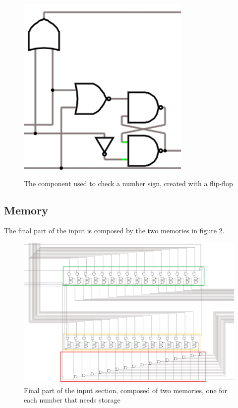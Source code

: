 \documentclass{article}
\begin{document}
\begin{figure}[h]
    \centering
    \includegraphics[scale=.5]{IM_SignBit}
    \caption{The component used to check a number sign, created with a flip-flop}
    \label{SignBit}
\end{figure}

\clearpage
\subsection{Memory}
The final part of the input is composed by the two memories in figure \ref{Memories}.

\begin{figure}[h]
    \centering  
    \includegraphics[scale=.5]{IM_Memories.PNG}
    \caption{Final part of the input section, composed of two memories, one for each number that needs storage}
    \label{Memories}
\end{figure}
\end{document}
